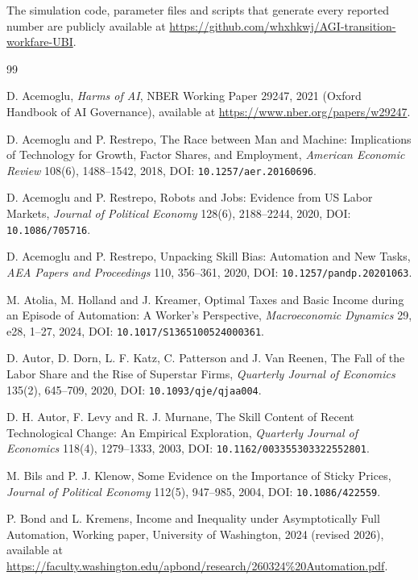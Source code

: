 \documentclass[review,12pt]{elsarticle}
\theoremstyle{plain}
\theoremstyle{definition}
\theoremstyle{remark}
\begin{document}
The simulation code, parameter files and scripts that generate every reported number are publicly available at \url{https://github.com/whxhkwj/AGI-transition-workfare-UBI}.
\begin{thebibliography}{99}
\enlargethispage{5\baselineskip}

 D. Acemoglu, \emph{Harms of AI}, NBER Working Paper 29247, 2021 (Oxford Handbook of AI Governance), available at \url{https://www.nber.org/papers/w29247}.

 D. Acemoglu and P. Restrepo, The Race between Man and Machine: Implications of Technology for Growth, Factor Shares, and Employment, \emph{American Economic Review} 108(6), 1488--1542, 2018, DOI: \texttt{10.1257/aer.20160696}.

 D. Acemoglu and P. Restrepo, Robots and Jobs: Evidence from US Labor Markets, \emph{Journal of Political Economy} 128(6), 2188--2244, 2020, DOI: \texttt{10.1086/705716}.

 D. Acemoglu and P. Restrepo, Unpacking Skill Bias: Automation and New Tasks, \emph{AEA Papers and Proceedings} 110, 356--361, 2020, DOI: \texttt{10.1257/pandp.20201063}.

 M. Atolia, M. Holland and J. Kreamer, Optimal Taxes and Basic Income during an Episode of Automation: A Worker's Perspective, \emph{Macroeconomic Dynamics} 29, e28, 1--27, 2024, DOI: \texttt{10.1017/S1365100524000361}.

 D. Autor, D. Dorn, L. F. Katz, C. Patterson and J. Van Reenen, The Fall of the Labor Share and the Rise of Superstar Firms, \emph{Quarterly Journal of Economics} 135(2), 645--709, 2020, DOI: \texttt{10.1093/qje/qjaa004}.

 D. H. Autor, F. Levy and R. J. Murnane, The Skill Content of Recent Technological Change: An Empirical Exploration, \emph{Quarterly Journal of Economics} 118(4), 1279--1333, 2003, DOI: \texttt{10.1162/003355303322552801}.

 M. Bils and P. J. Klenow, Some Evidence on the Importance of Sticky Prices, \emph{Journal of Political Economy} 112(5), 947--985, 2004, DOI: \texttt{10.1086/422559}.

 P. Bond and L. Kremens, Income and Inequality under Asymptotically Full Automation, Working paper, University of Washington, 2024 (revised 2026), available at \url{https://faculty.washington.edu/apbond/research/260324%20Automation.pdf}.


\end{thebibliography}
\end{document}

